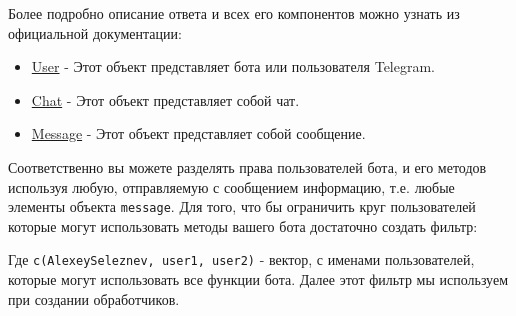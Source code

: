 \documentclass[
]{book}
\newenvironment{Shaded}{\begin{snugshade}}{\end{snugshade}}
\newcommand{\CommentTok}[1]{\textcolor[rgb]{0.56,0.35,0.01}{\textit{#1}}}
\newcommand{\ControlFlowTok}[1]{\textcolor[rgb]{0.13,0.29,0.53}{\textbf{#1}}}
\newcommand{\DocumentationTok}[1]{\textcolor[rgb]{0.56,0.35,0.01}{\textbf{\textit{#1}}}}
\newcommand{\FunctionTok}[1]{\textcolor[rgb]{0.00,0.00,0.00}{#1}}
\newcommand{\NormalTok}[1]{#1}
\newcommand{\OtherTok}[1]{\textcolor[rgb]{0.56,0.35,0.01}{#1}}
\newcommand{\SpecialCharTok}[1]{\textcolor[rgb]{0.00,0.00,0.00}{#1}}
\newcommand{\StringTok}[1]{\textcolor[rgb]{0.31,0.60,0.02}{#1}}
\providecommand{\tightlist}{%
  \setlength{\itemsep}{0pt}\setlength{\parskip}{0pt}}
\begin{document}
Более подробно описание ответа и всех его компонентов можно узнать из официальной документации:

\begin{itemize}
\tightlist
\item
  \href{https://tlgrm.ru/docs/bots/api\#user}{User} - Этот объект представляет бота или пользователя Telegram.
\item
  \href{https://tlgrm.ru/docs/bots/api\#chat}{Chat} - Этот объект представляет собой чат.
\item
  \href{https://tlgrm.ru/docs/bots/api\#message}{Message} - Этот объект представляет собой сообщение.
\end{itemize}

Соответственно вы можете разделять права пользователей бота, и его методов используя любую, отправляемую с сообщением информацию, т.е. любые элементы объекта \texttt{message}. Для того, что бы ограничить круг пользователей которые могут использовать методы вашего бота достаточно создать фильтр:

\begin{Shaded}
\end{Shaded}

Где \texttt{c(\textquotesingle{}AlexeySeleznev\textquotesingle{},\ \textquotesingle{}user1\textquotesingle{},\ \textquotesingle{}user2\textquotesingle{})} - вектор, с именами пользователей, которые могут использовать все функции бота. Далее этот фильтр мы используем при создании обработчиков.
\end{document}
